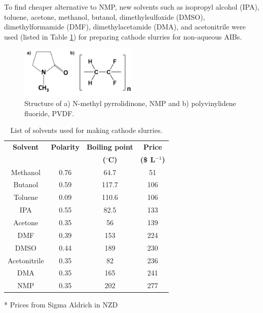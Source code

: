 To find cheaper alternative to NMP, new solvents such as isopropyl alcohol (IPA), toluene, acetone, methanol, butanol, dimethylsulfoxide (DMSO), dimethylformamide (DMF), dimethylacetamide (DMA), and acetonitrile were used (listed in Table \ref{tab1}) for preparing cathode slurries for non-aqueous AIBs. 

\begin{figure}[tbh!]
\centering
\includegraphics[width=0.5\textwidth]{Figures/chap7fig/nmppvdf}
\caption{Structure of a) N-methyl pyrrolidinone, NMP and b) polyvinylidene fluoride, PVDF.}
\label{Figures/chap7fig:nmppvdf}
\end{figure}

\begin{table}
\centering
\caption{List of solvents used for making cathode slurries.} \label{tab1}
\begin{threeparttable}
\begin{tabular}{|c|c|c|c|} 
\hline
\textbf{Solvent} & \textbf{Polarity} & \textbf{Boiling point} & \textbf{Price}\\
\textbf{} & \textbf{} & \textbf{($^{\circ}$C)} & \textbf{(\$ L$^{-1}$)}\\
\hline
Methanol & 0.76 & 64.7 & 51 \\ 
Butanol & 0.59 & 117.7 & 106 \\
Toluene & 0.09 & 110.6 & 106 \\
IPA & 0.55 & 82.5 & 133 \\
Acetone & 0.35 & 56 & 139 \\
DMF & 0.39 & 153 & 224 \\
DMSO & 0.44 & 189 & 230 \\
Acetonitrile & 0.35 & 82 & 236 \\
DMA & 0.35 & 165 & 241 \\
NMP & 0.35 & 202 & 277 \\
 \hline
\end{tabular}
\begin{tablenotes}
\item[*] Prices from Sigma Aldrich in NZD
\end{tablenotes}
\end{threeparttable}
\end{table}

